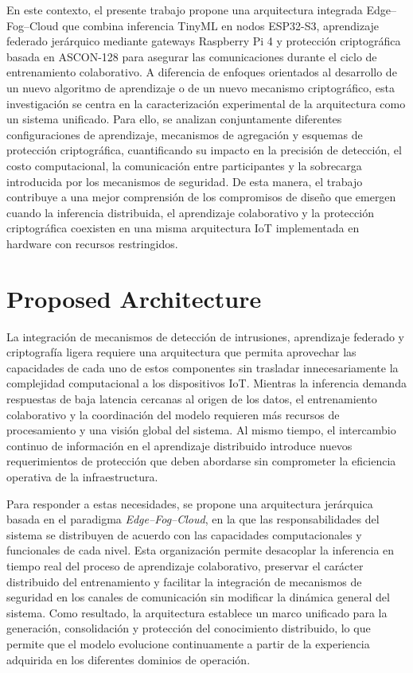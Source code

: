\documentclass[journal,article,submit,moreauthors]{Definitions/mdpi}
\begin{document}
En este contexto, el presente trabajo propone una arquitectura integrada Edge--Fog--Cloud que combina inferencia TinyML en nodos ESP32-S3, aprendizaje federado jerárquico mediante gateways Raspberry Pi 4 y protección criptográfica basada en ASCON-128 para asegurar las comunicaciones durante el ciclo de entrenamiento colaborativo. A diferencia de enfoques orientados al desarrollo de un nuevo algoritmo de aprendizaje o de un nuevo mecanismo criptográfico, esta investigación se centra en la caracterización experimental de la arquitectura como un sistema unificado. Para ello, se analizan conjuntamente diferentes configuraciones de aprendizaje, mecanismos de agregación y esquemas de protección criptográfica, cuantificando su impacto en la precisión de detección, el costo computacional, la comunicación entre participantes y la sobrecarga introducida por los mecanismos de seguridad. De esta manera, el trabajo contribuye a una mejor comprensión de los compromisos de diseño que emergen cuando la inferencia distribuida, el aprendizaje colaborativo y la protección criptográfica coexisten en una misma arquitectura IoT implementada en hardware con recursos restringidos.

\section{Proposed Architecture}
\label{sec:architecture}

La integración de mecanismos de detección de intrusiones, aprendizaje federado y criptografía ligera requiere una arquitectura que permita aprovechar las capacidades de cada uno de estos componentes sin trasladar innecesariamente la complejidad computacional a los dispositivos IoT. Mientras la inferencia demanda respuestas de baja latencia cercanas al origen de los datos, el entrenamiento colaborativo y la coordinación del modelo requieren más recursos de procesamiento y una visión global del sistema. Al mismo tiempo, el intercambio continuo de información en el aprendizaje distribuido introduce nuevos requerimientos de protección que deben abordarse sin comprometer la eficiencia operativa de la infraestructura.

Para responder a estas necesidades, se propone una arquitectura jerárquica basada en el paradigma \textit{Edge--Fog--Cloud}, en la que las responsabilidades del sistema se distribuyen de acuerdo con las capacidades computacionales y funcionales de cada nivel. Esta organización permite desacoplar la inferencia en tiempo real del proceso de aprendizaje colaborativo, preservar el carácter distribuido del entrenamiento y facilitar la integración de mecanismos de seguridad en los canales de comunicación sin modificar la dinámica general del sistema. Como resultado, la arquitectura establece un marco unificado para la generación, consolidación y protección del conocimiento distribuido, lo que permite que el modelo evolucione continuamente a partir de la experiencia adquirida en los diferentes dominios de operación.
\end{document}
